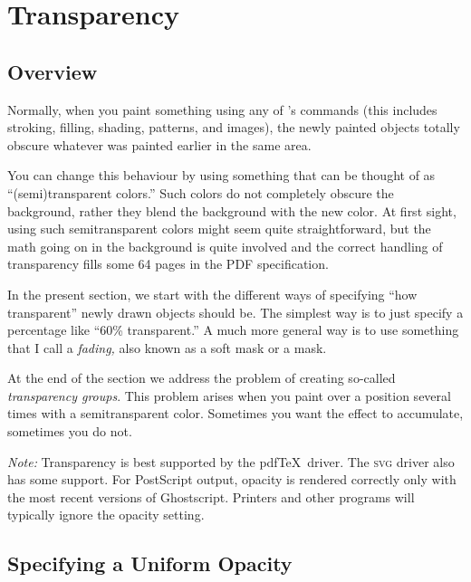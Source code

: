 %
%
%


\section{Transparency}

\label{section-tikz-transparency}


\subsection{Overview}

Normally, when you paint something using any of \tikzname's commands
(this includes stroking, filling, shading, patterns, and images), the
newly painted objects totally obscure whatever was painted earlier in
the same area.

You can change this behaviour by using something that can be thought
of as ``(semi)transparent colors.'' Such colors do not completely
obscure the background, rather they blend the background with the new
color. At first sight, using such semitransparent colors might seem quite
straightforward, but the math going on in the background is quite
involved and the correct handling of transparency fills some 64 pages
in the PDF specification.

In the present section, we start with the different ways of specifying
``how transparent'' newly drawn objects should be. The simplest way is
to just specify a percentage like ``60\% transparent.'' A much more
general way is to use something that I call a \emph{fading,} also
known as a soft mask or a mask.

At the end of the section we address the problem of creating so-called
\emph{transparency groups}. This problem arises when you paint over a
position several times with a semitransparent color. Sometimes you
want the effect to accumulate, sometimes you do not.

\emph{Note:} Transparency is best supported by the pdf\TeX\
driver. The \textsc{svg} driver also has some support. For PostScript
output, opacity is rendered correctly only with the most recent
versions of Ghostscript. Printers and other programs will typically
ignore the opacity setting.



\subsection{Specifying a Uniform Opacity}

